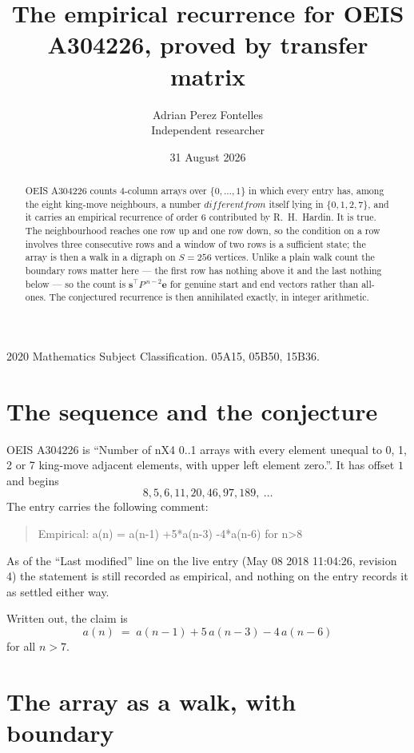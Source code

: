 \documentclass[11pt,a4paper]{article}
\title{The empirical recurrence for OEIS A304226, proved by transfer matrix}
\author{Adrian Perez Fontelles\\ \small Independent researcher}
\date{31 August 2026}
\theoremstyle{plain}
\theoremstyle{definition}
\begin{document}
\maketitle

\begin{abstract}
OEIS A304226 counts $4$-column arrays over $\{0,\dots,1\}$ in which every entry has,
among the eight king-move neighbours, a number $different from$ itself lying in $\{0,1,2,7\}$, and it carries an empirical
recurrence of order $6$ contributed by R.~H.~Hardin. It is true. The neighbourhood
reaches one row up and one row down, so the condition on a row involves three consecutive
rows and a window of two rows is a sufficient state; the array is then a walk in a digraph
on $S=256$ vertices. Unlike a plain walk count the boundary rows matter here --- the first
row has nothing above it and the last nothing below --- so the count is
$\mathbf{s}^{\!\top}P^{\,n-2}\mathbf{e}$ for genuine start and end vectors rather than
all-ones. The conjectured recurrence is then annihilated exactly, in integer arithmetic.
\end{abstract}

\noindent\small 2020 Mathematics Subject Classification. 05A15, 05B50, 15B36.\normalsize

\section{The sequence and the conjecture}

OEIS A304226 is ``Number of nX4 0..1 arrays with every element unequal to 0, 1, 2 or 7 king-move adjacent elements, with upper left element zero.''. It has offset
$1$ and begins
\[
8, 5, 6, 11, 20, 46, 97, 189,\ \dots
\]
The entry carries the following comment:
\begin{quote}\small
Empirical: a(n) = a(n-1) +5*a(n-3) -4*a(n-6) for n>8
\end{quote}
As of the ``Last modified'' line on the live entry (May 08 2018 11:04:26, revision
4) the statement is still recorded as empirical, and nothing on the entry
records it as settled either way.

Written out, the claim is
\begin{equation}\label{eq:conj}
a(n)\;=\;a(n-1) + 5\,a(n-3) - 4\,a(n-6)
\end{equation}
for all $n>7$.

\section{The array as a walk, with boundary}
\end{document}
